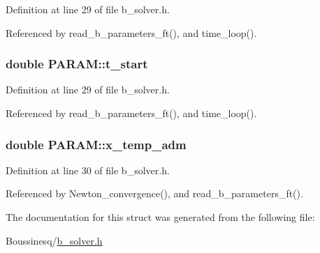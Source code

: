 Definition at line 29 of file b\-\_\-solver.\-h.



Referenced by read\-\_\-b\-\_\-parameters\-\_\-ft(), and time\-\_\-loop().

\hypertarget{struct_p_a_r_a_m_a50360071f78d7a9b7a009e6efc6c82cb}{
\subsubsection[{t\-\_\-start}]{\setlength{\rightskip}{0pt plus 5cm}double P\-A\-R\-A\-M\-::t\-\_\-start}}\label{struct_p_a_r_a_m_a50360071f78d7a9b7a009e6efc6c82cb}


Definition at line 29 of file b\-\_\-solver.\-h.



Referenced by read\-\_\-b\-\_\-parameters\-\_\-ft(), and time\-\_\-loop().

\hypertarget{struct_p_a_r_a_m_a0b65307c9584f0783adc40141903c39a}{
\subsubsection[{x\-\_\-temp\-\_\-adm}]{\setlength{\rightskip}{0pt plus 5cm}double P\-A\-R\-A\-M\-::x\-\_\-temp\-\_\-adm}}\label{struct_p_a_r_a_m_a0b65307c9584f0783adc40141903c39a}


Definition at line 30 of file b\-\_\-solver.\-h.



Referenced by Newton\-\_\-convergence(), and read\-\_\-b\-\_\-parameters\-\_\-ft().



The documentation for this struct was generated from the following file\-:\begin{DoxyCompactItemize}
\item 
Boussinesq/\hyperlink{b__solver_8h}{b\-\_\-solver.\-h}\end{DoxyCompactItemize}
